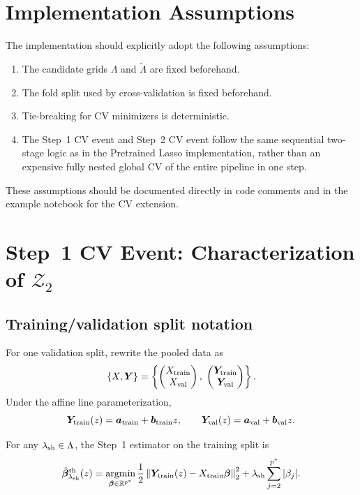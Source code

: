 \documentclass[11pt]{article}
\begin{document}
\section{Implementation Assumptions}
The implementation should explicitly adopt the following assumptions:
\begin{enumerate}[leftmargin=2em]
    \item The candidate grids $\Lambda$ and $\tilde{\Lambda}$ are fixed beforehand.
    \item The fold split used by cross-validation is fixed beforehand.
    \item Tie-breaking for CV minimizers is deterministic.
    \item The Step~1 CV event and Step~2 CV event follow the same sequential two-stage logic as in the Pretrained Lasso implementation, rather than an expensive fully nested global CV of the entire pipeline in one step.
\end{enumerate}

These assumptions should be documented directly in code comments and in the example notebook for the CV extension.

\section{Step~1 CV Event: Characterization of $\mathcal{Z}_2$}

\subsection{Training/validation split notation}
For one validation split, rewrite the pooled data as
\[
\{X, \bm{Y}\} = \left\{ \begin{pmatrix} X_{\rm train} \\ X_{\rm val} \end{pmatrix},\; \begin{pmatrix} \bm{Y}_{\rm train} \\ \bm{Y}_{\rm val} \end{pmatrix} \right\}.
\]
Under the affine line parameterization,
\[
\bm{Y}_{\rm train}(z) = \bm{a}_{\rm train} + \bm{b}_{\rm train} z,
\qquad
\bm{Y}_{\rm val}(z) = \bm{a}_{\rm val} + \bm{b}_{\rm val} z.
\]

For any $\lambda_{\rm sh} \in \Lambda$, the Step~1 estimator on the training split is
\[
\hat{\bm\beta}^{\rm sh}_{\lambda_{\rm sh}}(z)
=
\operatorname*{argmin}_{\bm\beta \in \mathbb{R}^{p^*}}
\frac{1}{2}\left\| \bm{Y}_{\rm train}(z) - X_{\rm train}\bm\beta \right\|_2^2
+
\lambda_{\rm sh}\sum_{j=2}^{p^*} |\beta_j|.
\]
\end{document}
